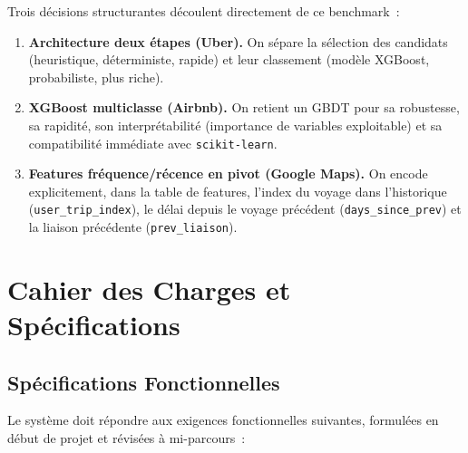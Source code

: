 \documentclass[11pt, a4paper]{article}
\begin{document}
Trois décisions structurantes découlent directement de ce benchmark~:
\begin{enumerate}
\item \textbf{Architecture deux étapes (Uber).} On sépare la sélection
    des candidats (heuristique, déterministe, rapide) et leur classement
    (modèle XGBoost, probabiliste, plus riche).
\item \textbf{XGBoost multiclasse (Airbnb).} On retient un GBDT pour
    sa robustesse, sa rapidité, son interprétabilité (importance de
    variables exploitable) et sa compatibilité immédiate avec
    \texttt{scikit-learn}.
\item \textbf{Features fréquence/récence en pivot (Google Maps).} On
    encode explicitement, dans la table de features, l'index du voyage
    dans l'historique (\texttt{user\_trip\_index}), le délai depuis le
    voyage précédent (\texttt{days\_since\_prev}) et la liaison
    précédente (\texttt{prev\_liaison}).
\end{enumerate}

\newpage
\section{Cahier des Charges et Spécifications}

\subsection{Spécifications Fonctionnelles}

Le système doit répondre aux exigences fonctionnelles suivantes,
formulées en début de projet et révisées à mi-parcours~:
\end{document}

